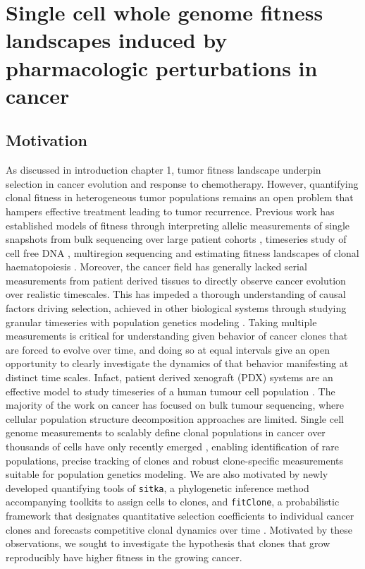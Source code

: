 
{\chapter{Single  cell  whole genome fitness  landscapes  induced  by pharmacologic perturbations in cancer}
}
\label{ch:Chapter4}

\section{Motivation}
As discussed in introduction chapter 1, tumor fitness landscape underpin selection in cancer evolution and response to chemotherapy. However, quantifying clonal fitness in heterogeneous tumor populations remains an open problem that hampers effective treatment leading to tumor recurrence. Previous work has established models of fitness through interpreting allelic measurements of single snapshots \cite{williams2016identification, williams2018quantification,gerstung2020evolutionary,shah2012clonal,nik2012life} from bulk sequencing over large patient cohorts \cite{martincorena2017universal}, timeseries study of cell free DNA \cite{khan2018longitudinal}, multiregion sequencing \cite{Gerlinger2014-qd,Jamal-Hanjani2017-yc,Lopez2020-ku,mcpherson2016divergent,williams2018quantification} and estimating fitness landscapes of clonal haematopoiesis \cite{Watson2020-yu}. Moreover, the cancer field has generally lacked serial measurements from patient derived tissues to directly observe cancer evolution over realistic timescales. This has impeded a thorough understanding of causal factors driving selection, achieved in other biological systems through studying granular timeseries with population genetics modeling \cite{good2017dynamics}. Taking multiple measurements is critical for understanding  given behavior of cancer clones that are forced to evolve over time, and doing so at equal intervals give an open opportunity to clearly investigate the dynamics of that behavior manifesting at distinct time scales. Infact, patient derived xenograft (PDX)\cite{aparicio2015examining} systems are an effective model to study timeseries of a human tumour cell population \cite{williams2018using,willey2015patient}.
The majority of the work on cancer has focused on bulk tumour sequencing, where cellular population structure decomposition approaches are limited. Single cell genome measurements to scalably define clonal populations in cancer over thousands of cells have only recently emerged \cite{Laks2019-dm,zahn2017scalable}, enabling identification of rare populations, precise tracking of clones and robust clone-specific measurements suitable for population genetics modeling. We are also motivated by newly developed quantifying tools of \texttt{sitka}, a phylogenetic inference method accompanying toolkits to assign cells to clones, \cite{dorri2020efficient} and  \texttt{fitClone}, a probabilistic framework that designates quantitative selection coefficients to individual cancer clones and forecasts competitive clonal dynamics over time \cite{salehi2020single}. Motivated by these observations, we sought to investigate the hypothesis that clones that grow reproducibly have higher fitness in the growing cancer.



